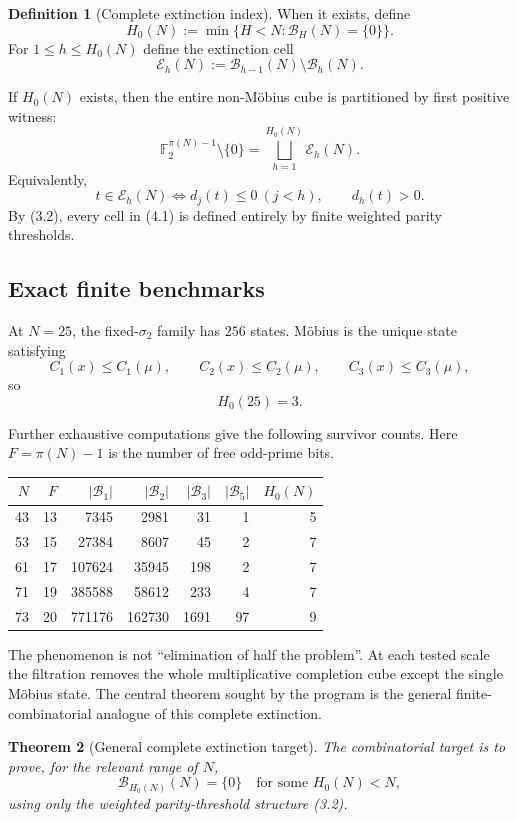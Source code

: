 \documentclass[11pt]{article}
\newtheorem{theorem}{Theorem}[section]
\theoremstyle{definition}
\newtheorem{definition}[theorem]{Definition}
\theoremstyle{remark}
\newcommand{\Ftwo}{\mathbb F_2}
\newcommand{\BH}{\mathcal B}
\newcommand{\EH}{\mathcal E}
\begin{document}
\begin{definition}[Complete extinction index]
When it exists, define
\[
 \boxed{
 H_0(N):=\min\{H<N:\BH_H(N)=\{0\}\}.
 }
\]
For $1\le h\le H_0(N)$ define the extinction cell
\[
 \boxed{
 \EH_h(N):=\BH_{h-1}(N)\setminus\BH_h(N).
 }
\]
\end{definition}

If $H_0(N)$ exists, then the entire non-M\"obius cube is partitioned by first positive witness:
\[
 \boxed{
 \Ftwo^{\pi(N)-1}\setminus\{0\}
 =\bigsqcup_{h=1}^{H_0(N)}\EH_h(N).
 }
 \tag{4.1}
\]
Equivalently,
\[
 t\in\EH_h(N)
 \iff
 d_j(t)\le0\ (j<h),\qquad d_h(t)>0.
\]
By (3.2), every cell in (4.1) is defined entirely by finite weighted parity thresholds.

\subsection{Exact finite benchmarks}

At $N=25$, the fixed-$\sigma_2$ family has $256$ states.  M\"obius is the unique state satisfying
\[
 C_1(x)\le C_1(\mu),\qquad
 C_2(x)\le C_2(\mu),\qquad
 C_3(x)\le C_3(\mu),
\]
so
\[
 H_0(25)=3.
\]

Further exhaustive computations give the following survivor counts.  Here $F=\pi(N)-1$ is the number of free odd-prime bits.

\begin{center}
\begin{tabular}{rrrrrrr}
\toprule
$N$ & $F$ & $|\BH_1|$ & $|\BH_2|$ & $|\BH_3|$ & $|\BH_5|$ & $H_0(N)$\\
\midrule
43 & 13 & 7345   & 2981   & 31   & 1   & 5\\
53 & 15 & 27384  & 8607   & 45   & 2   & 7\\
61 & 17 & 107624 & 35945  & 198  & 2   & 7\\
71 & 19 & 385588 & 58612  & 233  & 4   & 7\\
73 & 20 & 771176 & 162730 & 1691 & 97  & 9\\
\bottomrule
\end{tabular}
\end{center}

The phenomenon is not ``elimination of half the problem''.  At each tested scale the filtration removes the whole multiplicative completion cube except the single M\"obius state.  The central theorem sought by the program is the general finite-combinatorial analogue of this complete extinction.

\begin{theorem}[General complete extinction target]\label{thm:CE-target}
The combinatorial target is to prove, for the relevant range of $N$,
\[
 \boxed{
 \BH_{H_0(N)}(N)=\{0\}
 \quad\text{for some }H_0(N)<N,
 }
 \tag{CE}
\]
using only the weighted parity-threshold structure (3.2).
\end{theorem}
\end{document}
